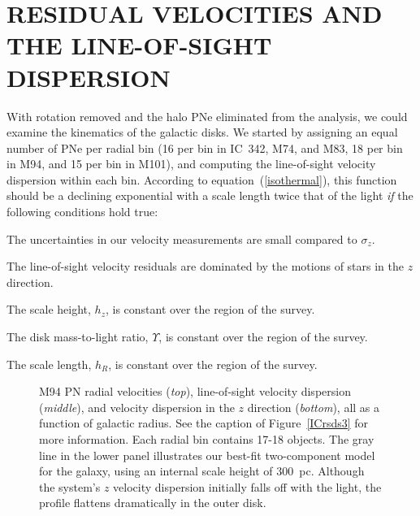 \documentclass[12pt,preprint]{emulateapj}
\newenvironment{packed_enum}{
\begin{enumerate}
  \setlength{\itemsep}{1pt}
  \setlength{\parskip}{0pt}
  \setlength{\parsep}{0pt}
}{\end{enumerate}}
\begin{document}

\section{RESIDUAL VELOCITIES AND THE LINE-OF-SIGHT DISPERSION}

With rotation removed and the halo PNe eliminated from the analysis, we could examine the kinematics of the galactic disks.  We started by assigning an equal number of PNe per radial bin (16 per bin in IC~342, M74, and M83, 18 per bin in M94, and 15 per bin in M101), and computing the line-of-sight velocity dispersion within each bin.  According to equation~(\ref{isothermal}), this function should be a declining exponential with a scale length twice that of the light {\it if\/} the following conditions hold true:
\begin{packed_enum}
\item The uncertainties in our velocity measurements are small compared to $\sigma_z$.
\item The line-of-sight velocity residuals are dominated by the motions of stars in the $z$ direction.  
\item The scale height, $h_z$, is constant over the region of the survey.
\item The disk mass-to-light ratio, $\Upsilon$, is constant over the region of the survey.
\item The scale length, $h_R$, is constant over the region of the survey.
\end{packed_enum}

\begin{figure}[b]
\caption{\scriptsize M94 PN radial velocities ({\it top}), line-of-sight velocity dispersion ({\it middle}), and velocity dispersion in the $z$ direction ({\it bottom}), all as a function of galactic radius.  See the caption of Figure~\ref{ICrsds3} for more information.  Each radial bin contains 17-18 objects.  The gray line in the lower panel illustrates our best-fit two-component model for the galaxy, using an internal scale height of 300~pc.  Although the system's $z$ velocity dispersion initially falls off with the light, the profile flattens dramatically in the outer disk.  \label{M94rsds3} }
\end{figure}
\end{document}
